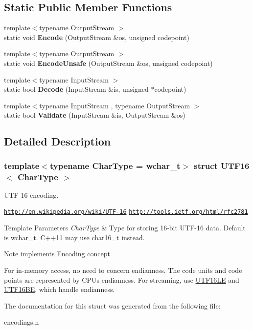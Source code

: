 \subsection*{Static Public Member Functions}
\begin{DoxyCompactItemize}
\item 
\mbox{\label{a02148_a9d8ded01244e30d037c4afa10ee2b30e}} 
{\footnotesize template$<$typename Output\+Stream $>$ }\\static void {\bfseries Encode} (Output\+Stream \&os, unsigned codepoint)
\item 
\mbox{\label{a02148_aa67661e756c273871b574e7133b7fc63}} 
{\footnotesize template$<$typename Output\+Stream $>$ }\\static void {\bfseries Encode\+Unsafe} (Output\+Stream \&os, unsigned codepoint)
\item 
\mbox{\label{a02148_a124c79dfd9f9b4c3fb65bd55ba17b4be}} 
{\footnotesize template$<$typename Input\+Stream $>$ }\\static bool {\bfseries Decode} (Input\+Stream \&is, unsigned $\ast$codepoint)
\item 
\mbox{\label{a02148_a7516184ed5dce10c0e7895bec124d97d}} 
{\footnotesize template$<$typename Input\+Stream , typename Output\+Stream $>$ }\\static bool {\bfseries Validate} (Input\+Stream \&is, Output\+Stream \&os)
\end{DoxyCompactItemize}


\subsection{Detailed Description}
\subsubsection*{template$<$typename Char\+Type = wchar\+\_\+t$>$\newline
struct U\+T\+F16$<$ Char\+Type $>$}

U\+T\+F-\/16 encoding. 

\href{http://en.wikipedia.org/wiki/UTF-16}{\tt http\+://en.\+wikipedia.\+org/wiki/\+U\+T\+F-\/16} \href{http://tools.ietf.org/html/rfc2781}{\tt http\+://tools.\+ietf.\+org/html/rfc2781} 
\begin{DoxyTemplParams}{Template Parameters}
{\em Char\+Type} & Type for storing 16-\/bit U\+T\+F-\/16 data. Default is wchar\+\_\+t. C++11 may use char16\+\_\+t instead. \\
\hline
\end{DoxyTemplParams}
\begin{DoxyNote}{Note}
implements Encoding concept

For in-\/memory access, no need to concern endianness. The code units and code points are represented by C\+PU\textquotesingle{}s endianness. For streaming, use \hyperlink{a02152}{U\+T\+F16\+LE} and \hyperlink{a02156}{U\+T\+F16\+BE}, which handle endianness. 
\end{DoxyNote}


The documentation for this struct was generated from the following file\+:\begin{DoxyCompactItemize}
\item 
encodings.\+h\end{DoxyCompactItemize}
